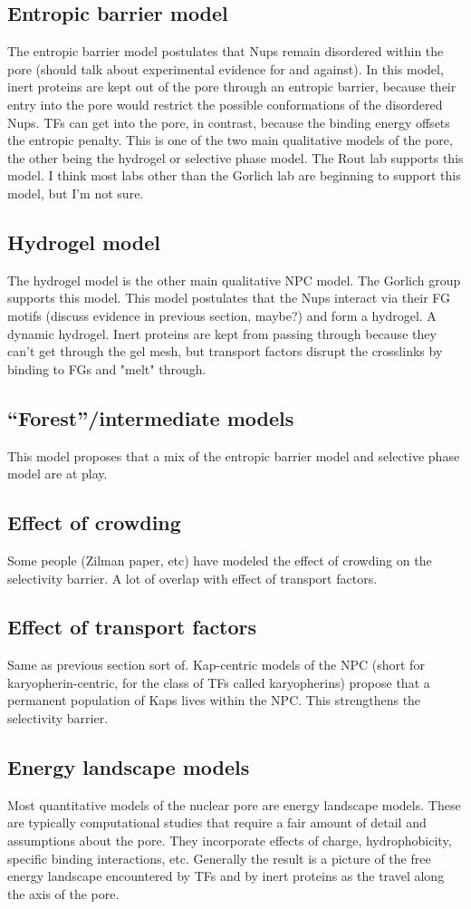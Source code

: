 \subsection{Entropic barrier model}
The entropic barrier model postulates that Nups remain disordered within the pore (should talk about experimental evidence for and against).  In this model, inert proteins are kept out of the pore through an entropic barrier, because their entry into the pore would restrict the possible conformations of the disordered Nups.  TFs can get into the pore, in contrast, because the binding energy offsets the entropic penalty.  This is one of the two main qualitative models of the pore, the other being the hydrogel or selective phase model.  The Rout lab supports this model.  I think most labs other than the Gorlich lab are beginning to support this model, but I'm not sure.
\subsection{Hydrogel model}
The hydrogel model is the other main qualitative NPC model.  The Gorlich group supports this model.  This model postulates that the Nups interact via their FG motifs (discuss evidence in previous section, maybe?) and form a hydrogel.  A dynamic hydrogel.  Inert proteins are kept from passing through because they can't get through the gel mesh, but transport factors disrupt the crosslinks by binding to FGs and "melt" through.
\subsection{“Forest”/intermediate models}
This model proposes that a mix of the entropic barrier model and selective phase model are at play.
\subsection{Effect of crowding}
Some people (Zilman paper, etc) have modeled the effect of crowding on the selectivity barrier.  A lot of overlap with effect of transport factors.
\subsection{Effect of transport factors}
Same as previous section sort of.  Kap-centric models of the NPC (short for karyopherin-centric, for the class of TFs called karyopherins) propose that a permanent population of Kaps lives within the NPC.  This strengthens the selectivity barrier.
\subsection{Energy landscape models}
Most quantitative models of the nuclear pore are energy landscape models.  These are typically computational studies that require a fair amount of detail and assumptions about the pore.  They incorporate effects of charge, hydrophobicity, specific binding interactions, etc.  Generally the result is a picture of the free energy landscape encountered by TFs and by inert proteins as the travel along the axis of the pore.
